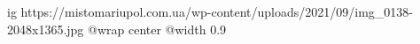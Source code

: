  
 
 
 
 

\ifcmt
  ig https://mistomariupol.com.ua/wp-content/uploads/2021/09/img_0138-2048x1365.jpg
  @wrap center
  @width 0.9
\fi
